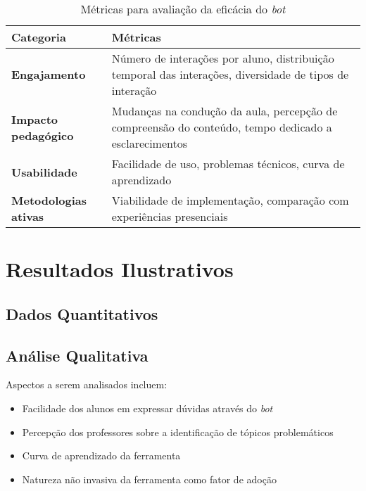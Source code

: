 \begin{table}[htb]
\centering
\caption{Métricas para avaliação da eficácia do \textit{bot}}
\label{tab:metricas}
\begin{tabular}{|p{3cm}|p{9cm}|}
\hline
\textbf{Categoria} & \textbf{Métricas} \\
\hline
\textbf{Engajamento} & Número de interações por aluno, distribuição temporal das
interações, diversidade de tipos de interação \\
\hline
\textbf{Impacto pedagógico} & Mudanças na condução da aula, percepção de
compreensão do conteúdo, tempo dedicado a esclarecimentos \\
\hline
\textbf{Usabilidade} & Facilidade de uso, problemas técnicos, curva de
aprendizado \\
\hline
\textbf{Metodologias ativas} & Viabilidade de implementação, comparação com
experiências presenciais \\
\hline
\end{tabular}
\end{table}

\section{Resultados Ilustrativos}
\label{sec:resultados}

\subsection{Dados Quantitativos}
\label{subsec:dados-quant}

\subsection{Análise Qualitativa}
\label{subsec:analise-qual}

Aspectos a serem analisados incluem:

\begin{itemize}
\item Facilidade dos alunos em expressar dúvidas através do \textit{bot} 
\item Percepção dos professores sobre a identificação de tópicos problemáticos
\item Curva de aprendizado da ferramenta
\item Natureza não invasiva da ferramenta como fator de adoção
\end{itemize}
